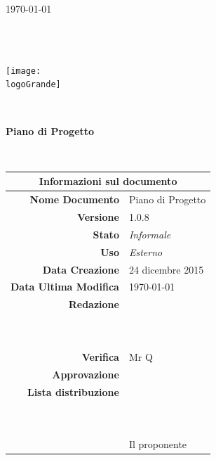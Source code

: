 \documentclass[12pt,a4paper]{article}
\title{\titoloDocumento}
\newcommand{\titoloDocumento}{Piano di Progetto}
\newcommand{\dataCreazione}{24 dicembre 2015}
\newcommand{\versione}{1.0.8}
\newcommand{\stato}{Informale}
\newcommand{\uso}{Esterno}
\begin{document}
\begin{titlepage}
\begin{center}
\today \\
\vspace{1cm}
\begin{Huge}
\textbf{\nomeGruppo} \\
\end{Huge}
\textbf{\prjL} \\
\vspace{1cm}
\texttt{[image: \\logoGrande]}
\vspace{1cm}

\HRule \\[0.4cm]
\begin{Huge}
{\huge \bfseries \titoloDocumento}\\[0.4cm]
\end{Huge}
\HRule \\[1cm]
\vfill

\begin{table}[H]
\begin{center}
\begin{tabular}{r | l}
\multicolumn{2}{c}{\textbf{Informazioni sul documento}}\\
\midrule
\textbf{Nome Documento}	&	\titoloDocumento	\\
\textbf{Versione}	&	\versione	\\
\textbf{Stato}	&	\emph{\stato}	\\
\textbf{Uso}	&	\emph{\uso}	\\
\textbf{Data Creazione}	&	\dataCreazione	\\
\textbf{Data Ultima Modifica}	&	\today	\\
\textbf{Redazione}	& \NDC \\
\ 	& \TP \\
\ 	& \IB \\
\textbf{Verifica}	&	Mr Q	\\
\textbf{Approvazione}	& \NDC \\
\textbf{Lista distribuzione}	&	\nomeGruppo	\\
\ 	&	\Vardanega	\\
\ 	&	\Cardin	\\
\ 	&	Il proponente \Zucchetti	\\

\end{tabular}
\end{center}
\end{table}

\end{center}
\end{titlepage}
\newpage
\end{document}
